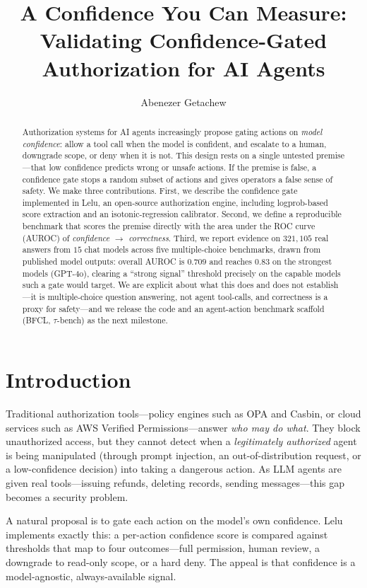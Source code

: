\documentclass[10pt,twocolumn]{article}
\title{\textbf{A Confidence You Can Measure:\\ Validating Confidence-Gated Authorization for AI Agents}}
\author[1]{Abenezer Getachew}
\affil[1]{Lelu \quad \texttt{abenezergetachew1990@gmail.com}}
\date{}
\begin{document}
\maketitle

\begin{abstract}
Authorization systems for AI agents increasingly propose gating actions on
\emph{model confidence}: allow a tool call when the model is confident, and
escalate to a human, downgrade scope, or deny when it is not. This design rests
on a single untested premise---that low confidence predicts wrong or unsafe
actions. If the premise is false, a confidence gate stops a random subset of
actions and gives operators a false sense of safety. We make three
contributions. First, we describe the confidence gate implemented in Lelu, an
open-source authorization engine, including logprob-based score extraction and an
isotonic-regression calibrator. Second, we define a reproducible benchmark that
scores the premise directly with the area under the ROC curve (AUROC) of
\emph{confidence $\rightarrow$ correctness}. Third, we report evidence on
$321{,}105$ real answers from $15$ chat models across five multiple-choice
benchmarks, drawn from published model outputs: overall AUROC is $0.709$ and
reaches $0.83$ on the strongest models (GPT-4o), clearing a ``strong signal''
threshold precisely on the capable models such a gate would target. We are
explicit about what this does and does not establish---it is multiple-choice
question answering, not agent tool-calls, and correctness is a proxy for
safety---and we release the code and an agent-action benchmark scaffold
(BFCL, $\tau$-bench) as the next milestone.
\end{abstract}

\section{Introduction}
Traditional authorization tools---policy engines such as OPA and Casbin, or cloud
services such as AWS Verified Permissions---answer \emph{who may do what}. They
block unauthorized access, but they cannot detect when a \emph{legitimately
authorized} agent is being manipulated (through prompt injection, an
out-of-distribution request, or a low-confidence decision) into taking a
dangerous action. As LLM agents are given real tools---issuing refunds, deleting
records, sending messages---this gap becomes a security problem.

A natural proposal is to gate each action on the model's own confidence. Lelu
implements exactly this: a per-action confidence score is compared against
thresholds that map to four outcomes---full permission, human review, a downgrade
to read-only scope, or a hard deny. The appeal is that confidence is a
model-agnostic, always-available signal.
\end{document}
